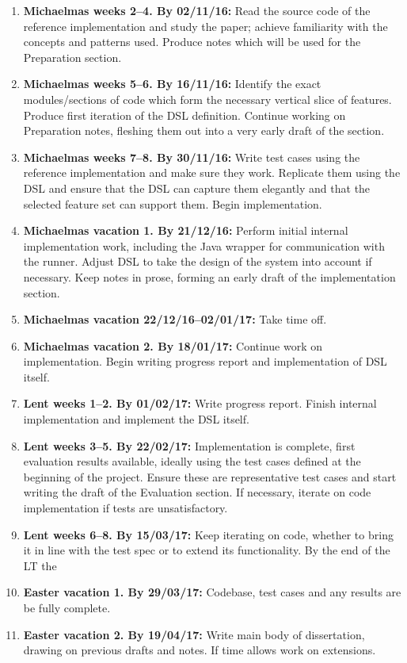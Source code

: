 \documentclass[11pt]{scrartcl}
\begin{document}
\begin{enumerate}

\item \textbf{Michaelmas weeks 2--4. By 02/11/16:} Read the source code of the reference implementation and study the paper; achieve familiarity with the concepts and patterns used. Produce notes which will be used for the Preparation section.

\item \textbf{Michaelmas weeks 5--6. By 16/11/16:} Identify the exact modules/sections of code which form the necessary vertical slice of features. Produce first iteration of the DSL definition. Continue working on Preparation notes, fleshing them out into a very early draft of the section.

\item \textbf{Michaelmas weeks 7--8. By 30/11/16:} Write test cases using the reference implementation and make sure they work. Replicate them using the DSL and ensure that the DSL can capture them elegantly and that the selected feature set can support them. Begin implementation. 

\item \textbf{Michaelmas vacation 1. By 21/12/16:} Perform initial internal implementation work, including the Java wrapper for communication with the runner. Adjust DSL to take the design of the system into account if necessary. Keep notes in prose, forming an early draft of the implementation section.
\item \textbf{Michaelmas vacation 22/12/16--02/01/17:} Take time off.

\item \textbf{Michaelmas vacation 2. By 18/01/17:} Continue work on implementation. Begin writing progress report and implementation of DSL itself.

\item \textbf{Lent weeks 1--2. By 01/02/17:} Write progress report. Finish internal implementation and implement the DSL itself.

\item \textbf{Lent weeks 3--5. By 22/02/17:} Implementation is complete, first evaluation results available, ideally using the test cases defined at the beginning of the project. Ensure these are representative test cases and start writing the draft of the Evaluation section. If necessary, iterate on code implementation if tests are unsatisfactory.

\item \textbf{Lent weeks 6--8. By 15/03/17:} Keep iterating on code, whether to bring it in line with the test spec or to extend its functionality. By the end of the LT the 
\item \textbf{Easter vacation 1. By 29/03/17:} Codebase, test cases and any results are be fully complete.
\item \textbf{Easter vacation 2. By 19/04/17:} Write main body of dissertation, drawing on previous drafts and notes. If time allows work on extensions.


\end{enumerate}
\end{document}
